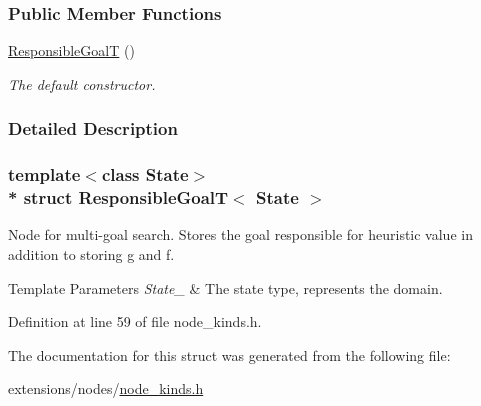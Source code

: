 \subsubsection*{Public Member Functions}
\begin{DoxyCompactItemize}
\item 
\hyperlink{structResponsibleGoalT_a5bd372e0cd7851572a738704848a504c}{Responsible\+GoalT} ()\hypertarget{structResponsibleGoalT_a5bd372e0cd7851572a738704848a504c}{}\label{structResponsibleGoalT_a5bd372e0cd7851572a738704848a504c}

\begin{DoxyCompactList}\small\item\em The default constructor. \end{DoxyCompactList}\end{DoxyCompactItemize}


\subsubsection{Detailed Description}
\subsubsection*{template$<$class State$>$\\*
struct Responsible\+Goal\+T$<$ State $>$}

Node for multi-\/goal search. Stores the goal responsible for heuristic value in addition to storing {\ttfamily g} and {\ttfamily f}. 


\begin{DoxyTemplParams}{Template Parameters}
{\em State\+\_\+} & The state type, represents the domain. \\
\hline
\end{DoxyTemplParams}


Definition at line 59 of file node\+\_\+kinds.\+h.



The documentation for this struct was generated from the following file\+:\begin{DoxyCompactItemize}
\item 
extensions/nodes/\hyperlink{node__kinds_8h}{node\+\_\+kinds.\+h}\end{DoxyCompactItemize}
